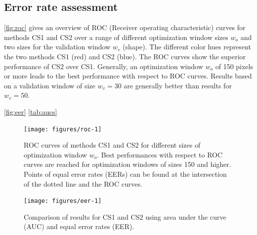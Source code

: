 \documentclass[12pt]{article}
\begin{document}
\hypertarget{error-rate-assessment}{%
\subsection{Error rate assessment}\label{error-rate-assessment}}

\autoref{fig:roc} gives an overview of ROC (Receiver operating
characteristic) curves for methods CS1 and CS2 over a range of different
optimization window sizes \(w_o\) and two sizes for the validation
window \(w_v\) (shape). The different color hues represent the two
methods CS1 (red) and CS2 (blue). The ROC curves show the superior
performance of CS2 over CS1. Generally, an optimization window \(w_o\)
of 150 pixels or more leads to the best performance with respect to ROC
curves. Results based on a validation window of size \(w_v = 30\) are
generally better than results for \(w_v = 50\).

\autoref{fig:eer}
\autoref{tab:aucs}

\begin{figure}

{\centering \texttt{[image: figures/roc-1]} 

}

\caption{ROC curves of methods CS1 and CS2 for different sizes of optimization window $w_o$. Best performances with respect to  ROC curves are reached for optimization windows of sizes 150 and higher. Points of equal error rates (EERs) can be found at the intersection of the dotted line and the ROC curves.}\label{fig:roc}
\end{figure}

\begin{figure}

{\centering \texttt{[image: figures/eer-1]} 

}

\caption{Comparison of results for CS1 and CS2 using area under the curve (AUC) and equal error rates (EER). }\label{fig:eer}
\end{figure}
\end{document}
